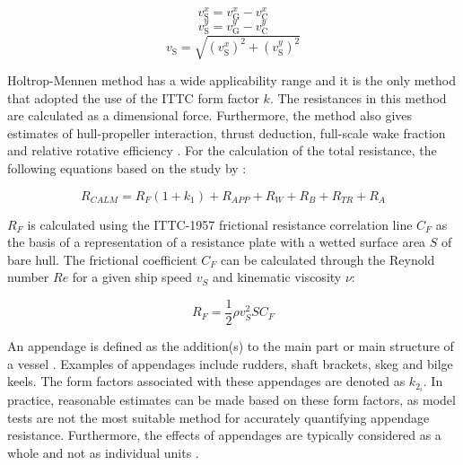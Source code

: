 \documentclass[]{interact}
\theoremstyle{plain}%
\theoremstyle{definition}
\theoremstyle{remark}
\begin{document}
\begin{equation}\label{eqn:stwx}
  v_{\text{S}}^x = v_{\text{G}}^x - v_{\text{C}}^x    
\end{equation}
\begin{equation}\label{eqn:stwy}
  v_{\text{S}}^y = v_{\text{G}}^y - v_{\text{C}}^y      
\end{equation}
\begin{equation}\label{eqn:stwabs}
  v_{\text{S}} = \sqrt{(v_{\text{S}}^x)^2 + (v_{\text{S}}^y)^2} 
\end{equation}

Holtrop-Mennen method has a wide applicability range and it is the only method that adopted the use of the ITTC form factor $k$. The resistances in this method are calculated as a dimensional force. Furthermore, the method also gives estimates of hull-propeller interaction, thrust deduction, full-scale wake fraction and relative rotative efficiency \citep{Birk.2019}. For the calculation of the total resistance, the following equations based on the study by \citet{Holtrop.1978,Holtrop.1982,Holtrop.1984}:

\begin{equation}\label{eqn:R_calm}
  R_{CALM} = R_F(1+k_1) + R_{APP} + R_W + R_B + R_{TR} + R_A
\end{equation}

\textbf{$R_F$} is calculated using the ITTC-1957 frictional resistance correlation line $C_F$ as the basis of a representation of a resistance plate with a wetted surface area $S$ of bare hull. The frictional coefficient $C_F$ can be calculated through the Reynold number $Re$ for a given ship speed $v_{S}$ and kinematic viscosity $\nu$: 

\begin{equation}\label{eqn:R_f}
  R_F = \frac{1}{2}\rho v_{S}^2 S C_F 
\end{equation}

An appendage is defined as the addition(s) to the main part or main structure of a vessel \citep{Molland.2011}. Examples of appendages include rudders, shaft brackets, skeg and bilge keels. The form factors associated with these appendages are denoted as $k_{2_i}$. In practice, reasonable estimates can be made based on these form factors, as model tests are not the most suitable method for accurately quantifying appendage resistance. Furthermore, the effects of appendages are typically considered as a whole and not as individual units \citep{Birk.2019}.\\
\end{document}

